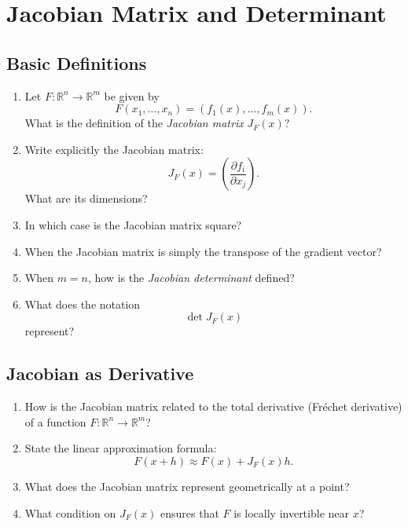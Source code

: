 \section{Jacobian Matrix and Determinant}

\subsection{Basic Definitions}

\begin{enumerate}

\item Let $F : \mathbb{R}^n \to \mathbb{R}^m$ be given by
  \[
    F(x_1,\dots,x_n) = (f_1(x),\dots,f_m(x)).
  \]
  What is the definition of the \emph{Jacobian matrix} $J_F(x)$?

\item Write explicitly the Jacobian matrix:
  \[
    J_F(x) = \left( \frac{\partial f_i}{\partial x_j} \right).
  \]
  What are its dimensions?

\item In which case is the Jacobian matrix square?

\item When the Jacobian matrix is simply the transpose of the gradient vector?

\item When $m = n$, how is the \emph{Jacobian determinant} defined?

\item What does the notation
  \[
    \det J_F(x)
  \]
  represent?

\end{enumerate}

\subsection{Jacobian as Derivative}

\begin{enumerate}

\item How is the Jacobian matrix related to the total derivative (Fréchet derivative) of a function $F : \mathbb{R}^n \to \mathbb{R}^m$?

\item State the linear approximation formula:
  \[
    F(x+h) \approx F(x) + J_F(x)h.
  \]

\item What does the Jacobian matrix represent geometrically at a point?

\item What condition on $J_F(x)$ ensures that $F$ is locally invertible near $x$?

\end{enumerate}

